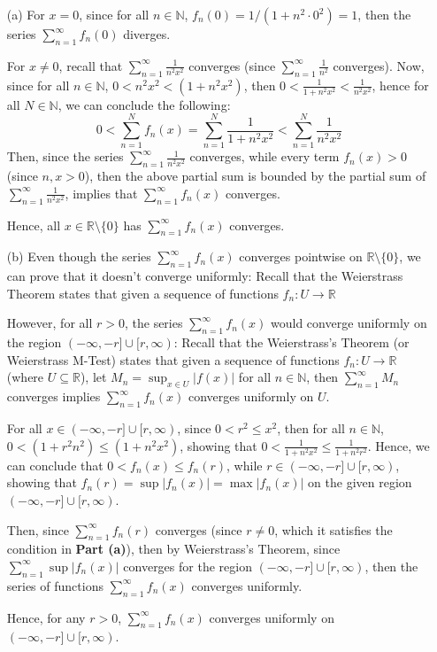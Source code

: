\documentclass{article}
\begin{document}
\begin{itemize}
    \item[(a)] For $x=0$, since for all $n\in\mathbb{N}$, $f_n(0)=1/(1+n^2\cdot 0^2)=1$, then the series $\sum_{n=1}^{\infty} f_n(0)$ diverges.
    
    \hfill
    
    For $x\neq 0$, recall that $\sum_{n=1}^{\infty}\frac{1}{n^2x^2}$ converges (since $\sum_{n=1}^{\infty}\frac{1}{n^2}$ converges).
    Now, since for all $n\in\mathbb{N}$, $0< n^2x^2 < (1+n^2x^2)$, then $0<\frac{1}{1+n^2x^2}<\frac{1}{n^2x^2}$, hence for all $N\in\mathbb{N}$, we can conclude the following:
    $$0 < \sum_{n=1}^{N}f_n(x)=\sum_{n=1}^{N}\frac{1}{1+n^2x^2}<\sum_{n=1}^{N}\frac{1}{n^2x^2}$$
    Then, since the series $\sum_{n=1}^{\infty}\frac{1}{n^2x^2}$ converges, while every term $f_n(x)>0$ (since $n,x>0$), then the above partial sum is bounded by the partial sum of $\sum_{n=1}^{\infty}\frac{1}{n^2x^2}$,
    implies that $\sum_{n=1}^{\infty}f_n(x)$ converges.

    Hence, all $x\in \mathbb{R}\setminus\{0\}$ has $\sum_{n=1}^{\infty}f_n(x)$ converges.
    
    \hfill
    
    \item[(b)] Even though the series $\sum_{n=1}^{\infty}f_n(x)$ converges pointwise on $\mathbb{R}\setminus\{0\}$, we can prove that it doesn't converge uniformly:
    Recall that the Weierstrass Theorem states that given a sequence of functions $f_n:U\rightarrow\mathbb{R}$

    \hfill

    However, for all $r>0$, the series $\sum_{n=1}^{\infty}f_n(x)$ would converge uniformly on the region $(-\infty,-r]\cup [r,\infty)$:
    Recall that the Weierstrass's Theorem (or Weierstrass M-Test) states that given a sequence of functions $f_n:U\rightarrow\mathbb{R}$ (where $U\subseteq \mathbb{R}$),
    let $M_n = \sup_{x\in U}|f(x)|$ for all $n\in\mathbb{N}$, then $\sum_{n=1}^{\infty}M_n$ converges implies $\sum_{n=1}^{\infty}f_n(x)$ converges uniformly on $U$.

    For all $x\in (-\infty,-r]\cup [r,\infty)$, since $0<r^2\leq x^2$, then for all $n\in\mathbb{N}$, $0<(1+r^2n^2)\leq (1+n^2x^2)$, showing that $0<\frac{1}{1+n^2x^2}\leq \frac{1}{1+n^2r^2}$.
    Hence, we can conclude that $0<f_n(x)\leq f_n(r)$, while $r\in (-\infty,-r]\cup [r,\infty)$, showing that $f_n(r)=\sup|f_n(x)| = \max|f_n(x)|$ on the given region $(-\infty,-r]\cup [r,\infty)$.

    Then, since $\sum_{n=1}^{\infty}f_n(r)$ converges (since $r\neq 0$, which it satisfies the condition in \textbf{Part (a)}), then by Weierstrass's Theorem, since $\sum_{n=1}^{\infty}\sup|f_n(x)|$ converges for the region $(-\infty,-r]\cup [r,\infty)$,
    then the series of functions $\sum_{n=1}^{\infty}f_n(x)$ converges uniformly.

    Hence, for any $r>0$, $\sum_{n=1}^{\infty}f_n(x)$ converges uniformly on $(-\infty,-r]\cup [r,\infty)$.
\end{itemize}
\end{document}
